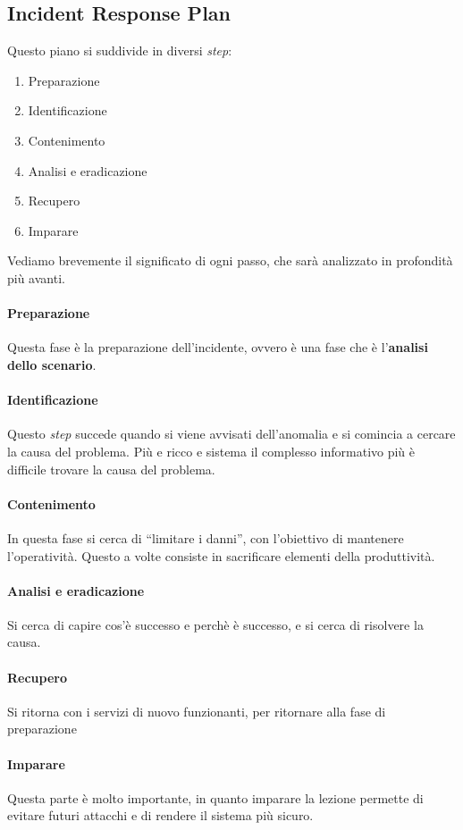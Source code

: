 \subsection{Incident Response Plan}

Questo piano si suddivide in diversi \textit{step}:
\begin{enumerate}
\item Preparazione
\item Identificazione
\item Contenimento
\item Analisi e eradicazione
\item Recupero
\item Imparare
\end{enumerate}

Vediamo brevemente il significato di ogni passo, che sarà analizzato in
profondità più avanti.

\paragraph*{Preparazione} Questa fase è la preparazione dell'incidente, ovvero è
una fase che è l'\textbf{analisi dello scenario}.

\paragraph*{Identificazione} Questo \textit{step} succede quando si viene
avvisati dell'anomalia e si comincia a cercare la causa del problema. Più e
ricco e sistema il complesso informativo più è difficile trovare la causa del
problema.

\paragraph*{Contenimento} In questa fase si cerca di ``limitare i danni'', con
l'obiettivo di mantenere l'operatività. Questo a volte consiste in sacrificare
elementi della produttività.

\paragraph*{Analisi e eradicazione} Si cerca di capire cos'è successo e perchè è
successo, e si cerca di risolvere la causa.

\paragraph*{Recupero} Si ritorna con i servizi di nuovo funzionanti, per
ritornare alla fase di preparazione

\paragraph*{Imparare} Questa parte è molto importante, in quanto imparare la
lezione permette di evitare futuri attacchi e di rendere il sistema più sicuro.

